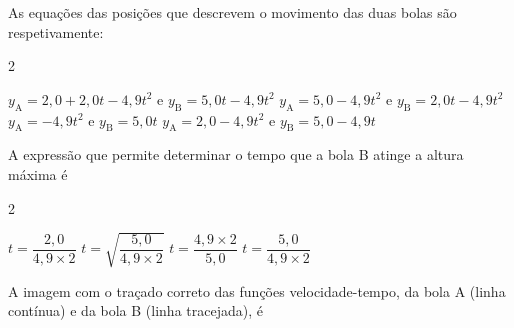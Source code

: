 \documentclass[addpoints]{exam}
\begin{document}
\begin{questions}
{		\vspace{5pt} 
		\begin{minipage}{\linewidth}
			\vspace{3pt}
			\centering
		\end{minipage}
		
		}
		
		\vspace{5pt}
		\question[10] As equações das posições que descrevem o movimento das duas bolas são respetivamente:
		
		\begin{multicols}{2}
			\begin{randomizechoices}
				\correctchoice $y_{\text{A}} = 2,0 + 2,0 t - 4,9 t^2$ e $y_{\text{B}} = 5,0 t - 4,9 t^2$
				\choice $y_{\text{A}} = 5,0 - 4,9 t^2$ e $y_{\text{B}} = 2,0 t - 4,9 t^2$
				\choice $y_{\text{A}} = - 4,9 t^2$ e $y_{\text{B}} = 5,0 t$
				\choice $y_{\text{A}} = 2,0 - 4,9 t^2$ e $y_{\text{B}} = 5,0 - 4,9 t$
			\end{randomizechoices}
		\end{multicols}
		
		\vspace{5pt}
		\question[10] A expressão que permite determinar o tempo que a bola B atinge a altura máxima é\\
		\begin{multicols}{2}
			\begin{randomizechoices}
				\choice $t = \dfrac{2,0}{4,9 \times 2}$
				\choice $t = \sqrt{\dfrac{5,0}{4,9 \times 2}}$
				\choice $t = \dfrac{4,9 \times 2}{5,0}$
				\correctchoice $t = \dfrac{5,0}{4,9 \times 2}$
			\end{randomizechoices}
		\end{multicols}
		
		\vspace{5pt}
		\question[10] A imagem com o traçado correto das funções velocidade-tempo, da bola A (linha contínua) e da bola B (linha tracejada), é
		

\end{questions}
\end{document}
